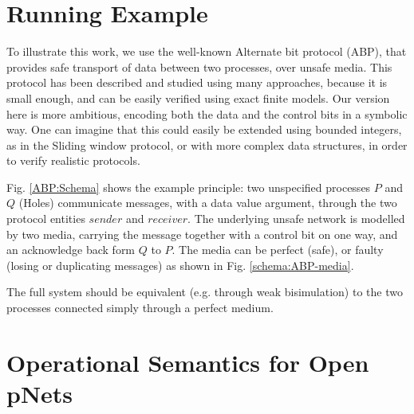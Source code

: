 \documentclass{lncs/llncs}
\begin{document}
\section{Running Example}
To illustrate this work, we use the well-known Alternate bit protocol
(ABP), that provides safe transport of data between two processes,
over unsafe media. This protocol has been described and studied using
many approaches, because it is small enough, and can be easily
verified using exact finite models. Our version here is more
ambitious, encoding both the data and the control bits in a symbolic
way. One can imagine that this could easily be extended using bounded
integers, as in the Sliding window protocol, or with more complex data
structures, in order to verify realistic protocols.

Fig. \ref{ABP:Schema} shows the example principle: two unspecified
processes $P$ and $Q$ (Holes) communicate messages, with a data value
argument, through the two protocol entities $sender$ and
$receiver$. The underlying unsafe network is modelled by two media,
carrying the message together with a control bit on one way, and an
acknowledge back form $Q$ to $P$. The media can be perfect (safe), or
faulty (losing or duplicating messages) as shown in
Fig. \ref{schema:ABP-media}.

The full system should be equivalent (e.g. through weak bisimulation)
to the two processes connected simply through a perfect medium.



\section{Operational Semantics for Open pNets}
\label{section:op-semantics}
\end{document}
